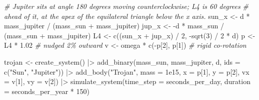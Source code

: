 \documentclass[
  10.5pt,
  letterpaper,
]{scrbook}
\newenvironment{Shaded}{\begin{snugshade}}{\end{snugshade}}
\newcommand{\AttributeTok}[1]{\textcolor[rgb]{0.00,0.00,0.00}{#1}}
\newcommand{\CommentTok}[1]{\textcolor[rgb]{0.00,0.00,0.00}{\textit{#1}}}
\newcommand{\DecValTok}[1]{\textcolor[rgb]{0.00,0.00,0.00}{#1}}
\newcommand{\FloatTok}[1]{\textcolor[rgb]{0.00,0.00,0.00}{#1}}
\newcommand{\FunctionTok}[1]{\textcolor[rgb]{0.00,0.00,0.00}{#1}}
\newcommand{\NormalTok}[1]{\textcolor[rgb]{0.00,0.00,0.00}{#1}}
\newcommand{\OtherTok}[1]{\textcolor[rgb]{0.00,0.00,0.00}{#1}}
\newcommand{\SpecialCharTok}[1]{\textcolor[rgb]{0.00,0.00,0.00}{#1}}
\newcommand{\StringTok}[1]{\textcolor[rgb]{0.00,0.00,0.00}{#1}}
\theoremstyle{definition}
\theoremstyle{plain}
\theoremstyle{remark}
\begin{document}
\begin{Shaded}
\begin{Highlighting}[]
\CommentTok{\# Jupiter sits at angle 180 degrees moving counterclockwise; L4 is 60 degrees}
\CommentTok{\# ahead of it, at the apex of the equilateral triangle below the x axis.}
\NormalTok{sun\_x }\OtherTok{\textless{}{-}}\NormalTok{ d }\SpecialCharTok{*}\NormalTok{ mass\_jupiter }\SpecialCharTok{/}\NormalTok{ (mass\_sun }\SpecialCharTok{+}\NormalTok{ mass\_jupiter)}
\NormalTok{jup\_x }\OtherTok{\textless{}{-}} \SpecialCharTok{{-}}\NormalTok{d }\SpecialCharTok{*}\NormalTok{ mass\_sun }\SpecialCharTok{/}\NormalTok{ (mass\_sun }\SpecialCharTok{+}\NormalTok{ mass\_jupiter)}
\NormalTok{L4    }\OtherTok{\textless{}{-}} \FunctionTok{c}\NormalTok{((sun\_x }\SpecialCharTok{+}\NormalTok{ jup\_x) }\SpecialCharTok{/} \DecValTok{2}\NormalTok{, }\SpecialCharTok{{-}}\FunctionTok{sqrt}\NormalTok{(}\DecValTok{3}\NormalTok{) }\SpecialCharTok{/} \DecValTok{2} \SpecialCharTok{*}\NormalTok{ d)}
\NormalTok{p     }\OtherTok{\textless{}{-}}\NormalTok{ L4 }\SpecialCharTok{*} \FloatTok{1.02}                            \CommentTok{\# nudged 2\% outward}
\NormalTok{v     }\OtherTok{\textless{}{-}}\NormalTok{ omega }\SpecialCharTok{*} \FunctionTok{c}\NormalTok{(}\SpecialCharTok{{-}}\NormalTok{p[}\DecValTok{2}\NormalTok{], p[}\DecValTok{1}\NormalTok{])               }\CommentTok{\# rigid co{-}rotation}

\NormalTok{trojan }\OtherTok{\textless{}{-}} \FunctionTok{create\_system}\NormalTok{() }\SpecialCharTok{|\textgreater{}}
  \FunctionTok{add\_binary}\NormalTok{(mass\_sun, mass\_jupiter, d, }\AttributeTok{ids =} \FunctionTok{c}\NormalTok{(}\StringTok{"Sun"}\NormalTok{, }\StringTok{"Jupiter"}\NormalTok{)) }\SpecialCharTok{|\textgreater{}}
  \FunctionTok{add\_body}\NormalTok{(}\StringTok{"Trojan"}\NormalTok{, }\AttributeTok{mass =} \FloatTok{1e15}\NormalTok{, }\AttributeTok{x =}\NormalTok{ p[}\DecValTok{1}\NormalTok{], }\AttributeTok{y =}\NormalTok{ p[}\DecValTok{2}\NormalTok{], }\AttributeTok{vx =}\NormalTok{ v[}\DecValTok{1}\NormalTok{], }\AttributeTok{vy =}\NormalTok{ v[}\DecValTok{2}\NormalTok{]) }\SpecialCharTok{|\textgreater{}}
  \FunctionTok{simulate\_system}\NormalTok{(}\AttributeTok{time\_step =}\NormalTok{ seconds\_per\_day, }\AttributeTok{duration =}\NormalTok{ seconds\_per\_year }\SpecialCharTok{*} \DecValTok{150}\NormalTok{)}
\end{Highlighting}
\end{Shaded}
\end{document}

